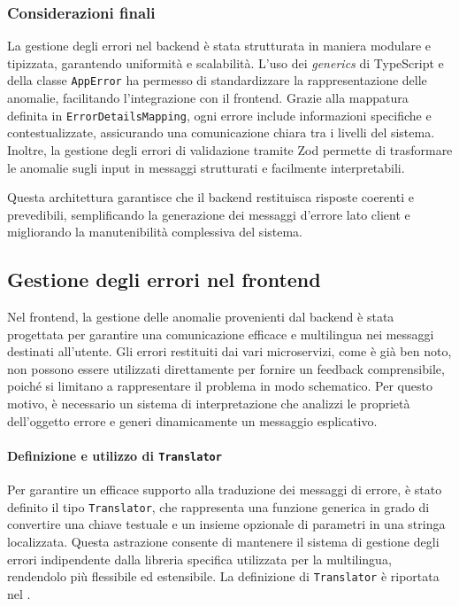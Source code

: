 \subsubsection{Considerazioni finali}
La gestione degli errori nel backend è stata strutturata in maniera modulare e tipizzata, garantendo uniformità e scalabilità. L’uso dei \textit{generics} di TypeScript e della classe \texttt{AppError} ha permesso di standardizzare la rappresentazione delle anomalie, facilitando l’integrazione con il frontend.
%
Grazie alla mappatura definita in \texttt{ErrorDetailsMapping}, ogni errore include informazioni specifiche e contestualizzate, assicurando una comunicazione chiara tra i livelli del sistema. Inoltre, la gestione degli errori di validazione tramite Zod permette di trasformare le anomalie sugli input in messaggi strutturati e facilmente interpretabili.

Questa architettura garantisce che il backend restituisca risposte coerenti e prevedibili, semplificando la generazione dei messaggi d'errore lato client e migliorando la manutenibilità complessiva del sistema.

\subsection{Gestione degli errori nel frontend}
Nel frontend, la gestione delle anomalie provenienti dal backend è stata progettata per garantire una comunicazione efficace e multilingua nei messaggi destinati all’utente. Gli errori restituiti dai vari microservizi, come è già ben noto, non possono essere utilizzati direttamente per fornire un feedback comprensibile, poiché si limitano a rappresentare il problema in modo schematico. Per questo motivo, è necessario un sistema di interpretazione che analizzi le proprietà dell'oggetto errore e generi dinamicamente un messaggio esplicativo.

\paragraph{Definizione e utilizzo di \texttt{Translator}}
Per garantire un efficace supporto alla traduzione dei messaggi di errore, è stato definito il tipo \texttt{Translator}, che rappresenta una funzione generica in grado di convertire una chiave testuale e un insieme opzionale di parametri in una stringa localizzata. Questa astrazione consente di mantenere il sistema di gestione degli errori indipendente dalla libreria specifica utilizzata per la multilingua, rendendolo più flessibile ed estensibile. La definizione di \texttt{Translator} è riportata nel .

